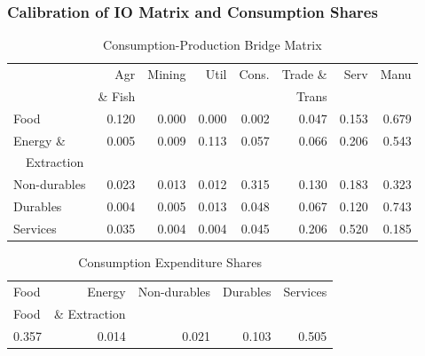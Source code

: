 \documentclass{beamer}
\begin{document}
\begin{frame}
  \frametitle{Calibration of IO Matrix and Consumption Shares}
  \footnotesize
  \begin{table}
  \caption{Consumption-Production Bridge Matrix}
  \begin{tabular}{lrrrrrrr}
    \hline
    \hline
     & Agr & Mining & Util & Cons. & Trade \& & Serv & Manu \\
     & \& Fish &  & &  & Trans & &  \\
    \hline
    Food & 0.120 & 0.000 & 0.000 & 0.002 & 0.047 & 0.153 & 0.679 \\
    Energy \& & 0.005 & 0.009 & 0.113 & 0.057 & 0.066 & 0.206 & 0.543 \\
    \ \ Extraction &  &  &  &  &  &  &  \\
    Non-durables & 0.023 & 0.013 & 0.012 & 0.315 & 0.130 & 0.183 & 0.323 \\
    Durables & 0.004 & 0.005 & 0.013 & 0.048 & 0.067 & 0.120 & 0.743 \\
    Services & 0.035 & 0.004 & 0.004 & 0.045 & 0.206 & 0.520 & 0.185 \\
    \hline
    \end{tabular}
\end{table}

  \begin{table}
  \caption{Consumption Expenditure Shares}
  \begin{tabular}{lrrrr}
\hline
\hline
Food & Energy & Non-durables & Durables & Services \\
Food & \& Extraction & &  & \\
\hline
0.357 & 0.014 & 0.021 & 0.103 & 0.505 \\
\hline
\end{tabular}
\end{table}

\end{frame}
\end{document}
